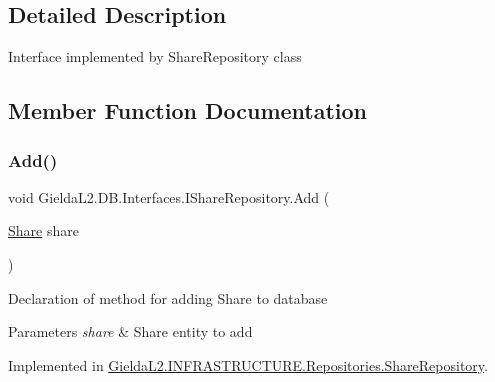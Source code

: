 \subsection{Detailed Description}
Interface implemented by Share\+Repository class 



\subsection{Member Function Documentation}
\mbox{\label{interface_gielda_l2_1_1_d_b_1_1_interfaces_1_1_i_share_repository_a92f21844eefac0604d9d195aa1f15214}} 
\subsubsection{\texorpdfstring{Add()}{Add()}}
{\footnotesize\ttfamily void Gielda\+L2.\+D\+B.\+Interfaces.\+I\+Share\+Repository.\+Add (\begin{DoxyParamCaption}\item[{\mbox{\hyperlink{class_gielda_l2_1_1_d_b_1_1_entities_1_1_share}{Share}}}]{share }\end{DoxyParamCaption})}



Declaration of method for adding Share to database 


\begin{DoxyParams}{Parameters}
{\em share} & Share entity to add\\
\hline
\end{DoxyParams}


Implemented in \mbox{\hyperlink{class_gielda_l2_1_1_i_n_f_r_a_s_t_r_u_c_t_u_r_e_1_1_repositories_1_1_share_repository_ab72f6f527449750b41956b564c892a7c}{Gielda\+L2.\+I\+N\+F\+R\+A\+S\+T\+R\+U\+C\+T\+U\+R\+E.\+Repositories.\+Share\+Repository}}.

\mbox{\label{interface_gielda_l2_1_1_d_b_1_1_interfaces_1_1_i_share_repository_a68449340553ab4702be8f3559ea50131}} 
